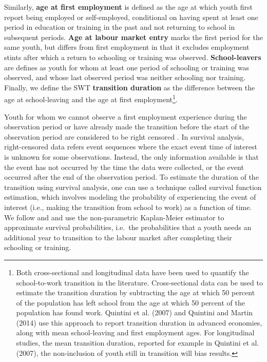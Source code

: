 \documentclass[
  a4paper, twoside, 12pt]{book}
\begin{document}
Similarly, \textbf{age at first employment} is defined as the age at which youth first report being employed or self-employed, conditional on having spent at least one period in education or training in the past and not returning to school in subsequent periods. \textbf{Age at labour market entry} marks the first period for the same youth, but differs from first employment in that it excludes employment stints after which a return to schooling or training was observed. \textbf{School-leavers} are defines as youth for whom at least one period of schooling or training was observed, and whose last observed period was neither schooling nor training. Finally, we define the SWT \textbf{transition duration} as the difference between the age at school-leaving and the age at first employment\footnote{Both cross-sectional and longitudinal data have been used to quantify the school-to-work transition in the literature. Cross-sectional data can be used to estimate the transition duration by subtracting the age at which 50 percent of  the  population  has  left  school  from  the  age  at  which  50  percent  of  the  population  has  found work. Quintini et al. (2007) and Quintini and Martin (2014) use this approach to report transition duration in advanced economies, along with mean school-leaving and first employment ages. For longitudinal studies,  the  mean  transition  duration,  reported  for  example  in  Quintini et al. (2007),  the  non-inclusion of youth still in transition will bias results.}.

Youth for whom we cannot observe a first employment experience during the observation period or have already made the transition before the start of the observation period are considered to be right censored \autocite{nilsson2019}. In survival analysis, right-censored data refers event sequences where the exact event time of interest is unknown for some observations. Instead, the only information available is that the event has not occurred by the time the data were collected, or the event occurred after the end of the observation period. To estimate the duration of the transition using survival analysis, one can use a technique called survival function estimation, which involves modeling the probability of experiencing the event of interest (i.e., making the transition from school to work) as a function of time. We follow \textcite{nordman2015} and \textcite{manacorda2017} and use the non-parametric Kaplan-Meier estimator to approximate survival probabilities, i.e.~the probabilities that a youth needs an additional year to transition to the labour market after completing their schooling or training.
\end{document}
